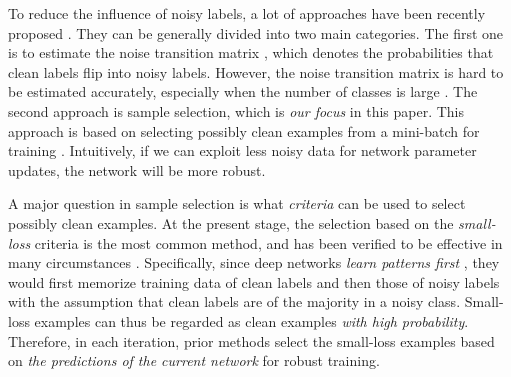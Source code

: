 \documentclass[11pt]{article}
\begin{document}
To reduce the influence of noisy labels, a lot of approaches have been recently proposed \citep{natarajan2013learning,liu2016classification,ma2018dimensionality,zhang2021learning,zheng2020error,xia2019anchor,xia2020part,tanaka2018joint,malach2017decoupling,li2019gradient,menon2018learning,thekumparampil2018robustness,xu2019l_dmi,wang2021learning,kim2019nlnl,jiang2020beyond,harutyunyan2020improving}. They can be generally divided into two main categories. The first one is to estimate the noise transition matrix \citep{patrini2017making,shu2020meta,hendrycks2018using,han2018masking}, which denotes the probabilities that clean labels flip into noisy labels. However, the noise transition matrix is hard to be estimated accurately, especially when the number of classes is large \citep{yu2019does}. The second approach is sample selection, which is \textit{our focus} in this paper. This approach is based on selecting possibly clean examples from a mini-batch for training \citep{han2018co,yao2020searching,wang2019co,yu2019does,lee2019robust,wang2019co,wang2018iterative}. Intuitively, if we can exploit less noisy data for network parameter updates, the network will be more robust.

A major question in sample selection is what \textit{criteria} can be used to select possibly clean examples. At the present stage, the selection based on the \textit{small-loss} criteria is the most common method, and has been verified to be effective in many circumstances \citep{han2018co,jiang2018mentornet,yu2019does,wei2020combating,yao2020searching}. Specifically, since deep networks \textit{learn patterns first} \citep{arpit2017closer}, they would first memorize training data of clean labels and then those of noisy labels with the assumption that clean labels are of the majority in a noisy class. Small-loss examples can thus be regarded as clean examples \textit{with high probability}. Therefore, in each iteration, prior methods \citep{han2018co,wei2020combating} select the small-loss examples based on \textit{the predictions of the current network} for robust training.
\end{document}
